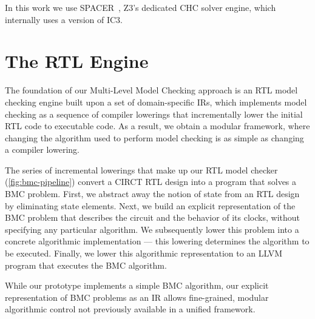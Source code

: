 \documentclass[acmsmall,screen,review]{acmart}
\begin{document}
In this work we use SPACER~\cite{spacer1,spacer2}, Z3's dedicated CHC solver engine, which internally uses a version of IC3.

\section{The \toolname{} RTL Engine}
\label{sec:bmc}
The foundation of our Multi-Level Model Checking approach is an RTL model
checking engine built upon a set of domain-specific IRs, which implements model checking
as a sequence of compiler lowerings that incrementally lower the initial RTL code to
executable code. As a result,
we obtain a modular framework, where changing the algorithm used to
perform model checking is as simple as changing a compiler lowering.

The series of incremental lowerings that make up our RTL model checker
(\autoref{fig:bmc-pipeline}) convert a CIRCT RTL design into a
program that solves a BMC problem.
First, we abstract away the notion of state from an RTL design by eliminating state elements.
Next, we build an explicit representation of the BMC problem that describes the circuit and the behavior of its clocks, without specifying any particular algorithm.
We subsequently lower this problem into a concrete algorithmic implementation
--- this lowering determines the algorithm to be executed.
Finally, we lower this algorithmic representation to an LLVM program that executes the BMC algorithm.

While our prototype implements a simple BMC algorithm, our explicit representation of BMC problems as an IR allows fine-grained, modular algorithmic control not previously available in a unified framework.

\end{document}
